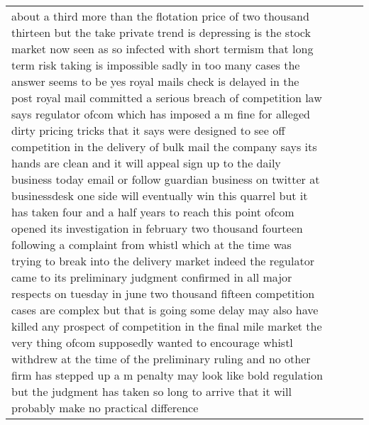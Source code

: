 \documentclass[]{article}
\begin{document}
\begin{table}[!h]
{\begin{tabular}[t]{llll}
about a third more than the flotation price of two thousand thirteen but the take private trend is depressing is the stock market now seen as so infected with short termism that long term risk taking is impossible sadly in too many cases the answer seems to be yes royal mails check is delayed in the post royal mail committed a serious breach of competition law says regulator ofcom which has imposed a m fine for alleged dirty pricing tricks that it says were designed to see off competition in the delivery of bulk mail the company says its hands are clean and it will appeal sign up to the daily business today email or follow guardian business on twitter at businessdesk one side will eventually win this quarrel but it has taken four and a half years to reach this point ofcom opened its investigation in february two thousand fourteen following a complaint from whistl which at the time was trying to break into the delivery market indeed the regulator came to its preliminary judgment confirmed in all major respects on tuesday in june two thousand fifteen competition cases are complex but that is going some delay may also have killed any prospect of competition in the final mile market the very thing ofcom supposedly wanted to encourage whistl withdrew at the time of the preliminary ruling and no other firm has stepped up a m penalty may look like bold regulation but the judgment has taken so long to arrive that it will probably make no practical difference\\

\end{tabular}}
\end{table}
\end{document}

